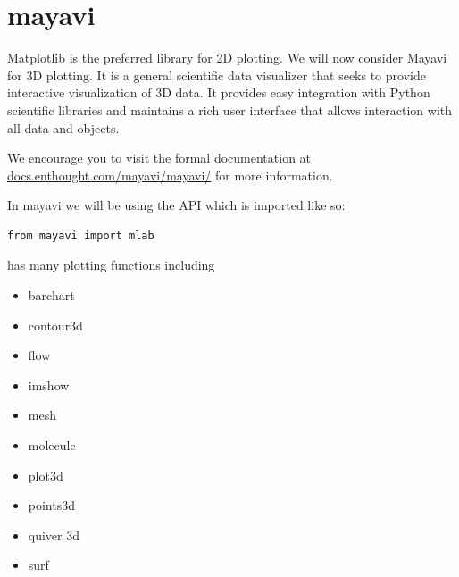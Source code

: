\section*{mayavi}

Matplotlib is the preferred library for 2D plotting. We will now
consider Mayavi for 3D plotting. It is a general scientific data
visualizer that seeks to provide interactive visualization of 3D data.
It provides easy integration with Python scientific libraries and
maintains a rich user interface that allows interaction with all data
and objects.

We encourage you to visit the formal documentation at
\url{docs.enthought.com/mayavi/mayavi/} for more information. 

In mayavi we will be using the  API which is imported like so:
\begin{lstlisting}
from mayavi import mlab
\end{lstlisting}

 has many plotting functions including
\begin{itemize}
\item barchart
\item contour3d
\item flow
\item imshow
\item mesh
\item molecule
\item plot3d
\item points3d
\item quiver 3d
\item surf
\end{itemize}

